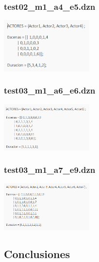\documentclass{article}
\begin{document}
\subsubsection{test02_m1_a4_e5.dzn}
\begin{center}
    \includegraphics[width=0.35\textwidth]{img/test02_m1.png}
\end{center}

\subsubsection{test03_m1_a6_e6.dzn}
\begin{center}
    \includegraphics[width=0.35\textwidth]{img/test03_m1.png}
\end{center}

\subsubsection{test03_m1_a7_e9.dzn}
\begin{center}
    \includegraphics[width=0.35\textwidth]{img/test04_m1.png}
\end{center}

\subsection{Conclusiones}
\end{document}

